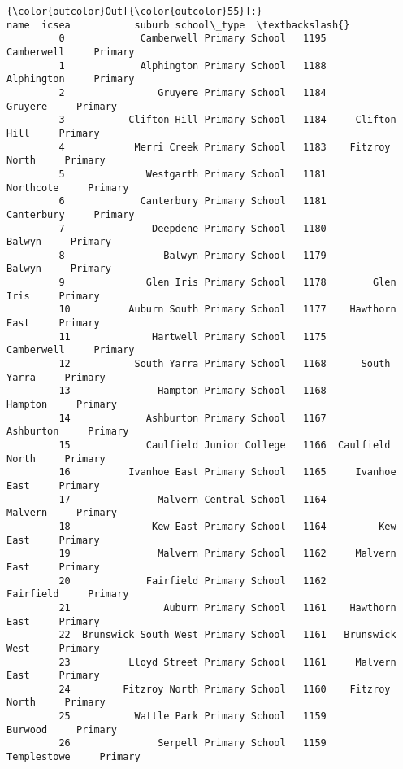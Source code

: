 \documentclass[11pt]{article}
\begin{document}
\begin{Verbatim}[commandchars=\\\{\}]
{\color{outcolor}Out[{\color{outcolor}55}]:}                                    name  icsea           suburb school\_type  \textbackslash{}
         0             Camberwell Primary School   1195       Camberwell     Primary   
         1             Alphington Primary School   1188       Alphington     Primary   
         2                Gruyere Primary School   1184          Gruyere     Primary   
         3           Clifton Hill Primary School   1184     Clifton Hill     Primary   
         4            Merri Creek Primary School   1183    Fitzroy North     Primary   
         5              Westgarth Primary School   1181        Northcote     Primary   
         6             Canterbury Primary School   1181       Canterbury     Primary   
         7               Deepdene Primary School   1180           Balwyn     Primary   
         8                 Balwyn Primary School   1179           Balwyn     Primary   
         9              Glen Iris Primary School   1178        Glen Iris     Primary   
         10          Auburn South Primary School   1177    Hawthorn East     Primary   
         11              Hartwell Primary School   1175       Camberwell     Primary   
         12           South Yarra Primary School   1168      South Yarra     Primary   
         13               Hampton Primary School   1168          Hampton     Primary   
         14             Ashburton Primary School   1167        Ashburton     Primary   
         15             Caulfield Junior College   1166  Caulfield North     Primary   
         16          Ivanhoe East Primary School   1165     Ivanhoe East     Primary   
         17               Malvern Central School   1164          Malvern     Primary   
         18              Kew East Primary School   1164         Kew East     Primary   
         19               Malvern Primary School   1162     Malvern East     Primary   
         20             Fairfield Primary School   1162        Fairfield     Primary   
         21                Auburn Primary School   1161    Hawthorn East     Primary   
         22  Brunswick South West Primary School   1161   Brunswick West     Primary   
         23          Lloyd Street Primary School   1161     Malvern East     Primary   
         24         Fitzroy North Primary School   1160    Fitzroy North     Primary   
         25           Wattle Park Primary School   1159          Burwood     Primary   
         26               Serpell Primary School   1159      Templestowe     Primary   

\end{Verbatim}
\end{document}
